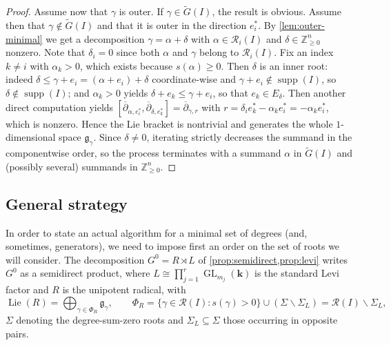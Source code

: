 \documentclass[11pt,letterpaper,reqno]{amsart}
\theoremstyle{remark}
\theoremstyle{definition}
\newcommand{\KK}[0]{\ensuremath{\mathbf{k}}}
\newcommand{\ZZ}[0]{\ensuremath{\mathbb{Z}}}
\newcommand{\supp}[0]{\ensuremath{\operatorname{supp}}}
\newcommand{\GL}[0]{\ensuremath{\operatorname{GL}}}
\newcommand{\R}{\mathcal R}
\begin{document}
\begin{proof}
Assume now that $\gamma$ is outer. If $\gamma\in\widetilde G(I)$, the result is obvious. Assume then that $\gamma\notin\widetilde G(I)$ and that it is outer in the direction $e_i^*$. By \cref{lem:outer-minimal} we get a decomposition $\gamma=\alpha+\delta$ with $\alpha\in\R_i(I)$ and $\delta\in\ZZ_{\geq 0}^n$ nonzero. Note that $\delta_i=0$ since both $\alpha$ and $\gamma$ belong to $\R_i(I)$. Fix an index $k\neq i$ with $\alpha_k>0$, which exists because $s(\alpha)\geq 0$. Then $\delta$ is an inner root: indeed $\delta\leq\gamma+e_i=(\alpha+e_i)+\delta$ coordinate-wise and $\gamma+e_i\notin\supp(I)$, so $\delta\notin\supp(I)$; and $\alpha_k>0$ yields $\delta+e_k\leq\gamma+e_i$, so that $e_k\in E_\delta$. Then another direct computation yields
$[\overline{\partial}_{\alpha,e_i^*},\overline{\partial}_{\delta,e_k^*}]=\overline\partial_{\gamma,r}$ with $r=\delta_i e_k^*-\alpha_k e_i^*=-\alpha_k e_i^*$, which is nonzero. Hence the Lie bracket is nontrivial and generates the whole $1$-dimensional space $\mathfrak g_\gamma$. Since $\delta\neq0$, iterating strictly
decreases the summand in the componentwise order, so the process
terminates with a summand $\alpha$ in $\widetilde G(I)$ and (possibly several) summands in $\ZZ_{\geq 0}^n$.
\end{proof}


\subsection{General strategy} In order to state an actual algorithm for a minimal set of degrees (and, sometimes, generators), we need to impose first an order on the set of roots we will consider. The decomposition $G^0=R\rtimes L$ of
\cref{prop:semidirect,prop:levi} writes $G^0$ as a semidirect product, where
$L\cong\prod_{j=1}^r\GL_{m_j}(\KK)$ is the standard Levi factor and $R$ is the
unipotent radical, with
$$
  \operatorname{Lie}(R)=\bigoplus_{\gamma\in\Phi_R}\mathfrak g_\gamma,\qquad
  \Phi_R=\{\gamma\in\mathcal R(I): s(\gamma)>0\}
  \cup (\Sigma\smallsetminus\Sigma_L)=\R(I)\smallsetminus\Sigma_L,
$$
$\Sigma$ denoting the degree-sum-zero roots and $\Sigma_L\subseteq\Sigma$ those
occurring in opposite pairs.
\end{document}
